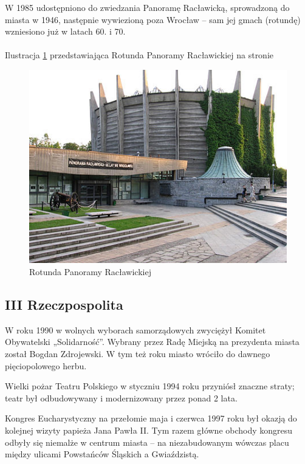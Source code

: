 \documentclass{article}
\begin{document}
W 1985 udostępniono do zwiedzania Panoramę Racławicką, sprowadzoną do miasta w 1946, następnie wywiezioną poza Wrocław – sam jej gmach (rotundę) wzniesiono już w latach 60. i 70.\\
\\
Ilustracja \ref{fig:rotunda} przedstawiająca Rotunda Panoramy Racławickiej
na stronie \pageref{fig:rotunda}
\begin{figure}[h!]
\centering
\includegraphics[scale=0.6]{RotundaPanoramyRaclawickiej.jpg}
\caption{Rotunda Panoramy Racławickiej}
\label{fig:rotunda}
\end{figure}

\subsection{III Rzeczpospolita}
W roku 1990 w wolnych wyborach samorządowych zwyciężył Komitet Obywatelski „Solidarność”. Wybrany przez Radę Miejską na prezydenta miasta został Bogdan Zdrojewski. W tym też roku miasto wróciło do dawnego pięciopolowego herbu.

Wielki pożar Teatru Polskiego w styczniu 1994 roku przyniósł znaczne straty; teatr był odbudowywany i modernizowany przez ponad 2 lata.

Kongres Eucharystyczny na przełomie maja i czerwca 1997 roku był okazją do kolejnej wizyty papieża Jana Pawła II. Tym razem główne obchody kongresu odbyły się niemalże w centrum miasta – na niezabudowanym wówczas placu między ulicami Powstańców Śląskich a Gwiaździstą.
\end{document}
